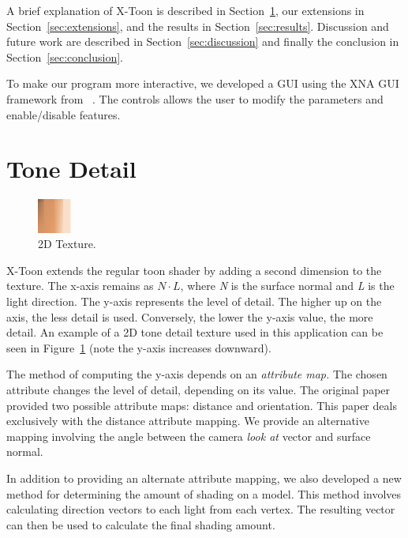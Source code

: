\documentclass[annual]{acmsiggraph}
\begin{document}
A brief explanation of X-Toon is described in Section~\ref{sec:tonedetail}, our extensions in Section~\ref{sec:extensions}, and the results in Section~\ref{sec:results}. Discussion and future work are described in Section~\ref{sec:discussion} and finally the conclusion in Section~\ref{sec:conclusion}.

To make our program more interactive, we developed a GUI using the XNA GUI framework from ~\cite{Ruminate}. The controls allows the user to modify the parameters and enable/disable features.

\section{Tone Detail}
\label{sec:tonedetail}
\begin{figure}
  \vspace{-20pt}
  \begin{center}
    \includegraphics[width=0.1\textwidth]{images/xtoon_skin}
  \end{center}
  \caption{2D Texture.}
  \vspace{-10pt}
  \label{fig:2dtexture}
\end{figure}
X-Toon extends the regular toon shader by adding a second dimension to the texture. The x-axis remains as $N\cdot L$, where {\it{N}} is the surface normal and {\it{L}} is the light direction. The y-axis represents the level of detail. The higher up on the axis, the less detail is used. Conversely, the lower the y-axis value, the more detail. An example of a 2D tone detail texture used in this application can be seen in Figure~\ref{fig:2dtexture} (note the y-axis increases downward).

The method of computing the y-axis depends on an {\it{attribute map.}} The chosen attribute changes the level of detail, depending on its value. The original paper provided two possible attribute maps: distance and orientation. This paper deals exclusively with the distance attribute mapping. We provide an alternative mapping involving the angle between the camera {\it{look at}} vector and surface normal. 

In addition to providing an alternate attribute mapping, we also developed a new method for determining the amount of shading on a model. This method involves calculating direction vectors to each light from each vertex. The resulting vector can then be used to calculate the final shading amount.
\end{document}
